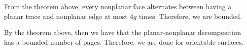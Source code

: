 \begin{corollary}
	From the theorem above, every nonplanar face alternates between having a planar trace and nonplanar edge at most $4g$ times. Therefore, we are bounded.
\end{corollary}

By the theorem above, then we have that the planar-nonplanar decomposition has a bounded number of pages. Therefore, we are done for orientable surfaces. 